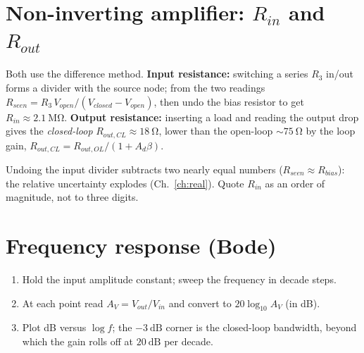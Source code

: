 \documentclass[11pt,a4paper,oneside]{book}
\newcommand{\Ad}{A_d}
\begin{document}
\section{Non-inverting amplifier: $R_{in}$ and $R_{out}$}

Both use the difference method. \textbf{Input resistance:} switching a series
$R_3$ in/out forms a divider with the source node; from the two readings
$R_{seen}=R_3\,V_{open}/(V_{closed}-V_{open})$, then undo the bias resistor to get
$R_{in}\approx\qty{2.1}{\mega\ohm}$. \textbf{Output resistance:} inserting a load
and reading the output drop gives the \emph{closed-loop}
$R_{out,CL}\approx\qty{18}{\ohm}$, lower than the open-loop $\sim\qty{75}{\ohm}$ by
the loop gain, $R_{out,CL}=R_{out,OL}/(1+\Ad\beta)$.

\begin{warning}
Undoing the input divider subtracts two nearly equal numbers
($R_{seen}\approx R_{bias}$): the relative uncertainty explodes
(Ch.~\ref{ch:real}). Quote $R_{in}$ as an order of magnitude, not to three digits.
\end{warning}

\section{Frequency response (Bode)}

\begin{protocol}
\begin{enumerate}[leftmargin=1.5cm]
  \item Hold the input amplitude constant; sweep the frequency in decade steps.
  \item At each point read $A_V=V_{out}/V_{in}$ and convert to
        $20\log_{10}A_V$ (in dB).
  \item Plot dB versus $\log f$; the $-\qty{3}{\dB}$ corner is the closed-loop
        bandwidth, beyond which the gain rolls off at $\qty{20}{\dB}$ per decade.
\end{enumerate}
\end{protocol}

\begin{center}
\end{center}
\end{document}

